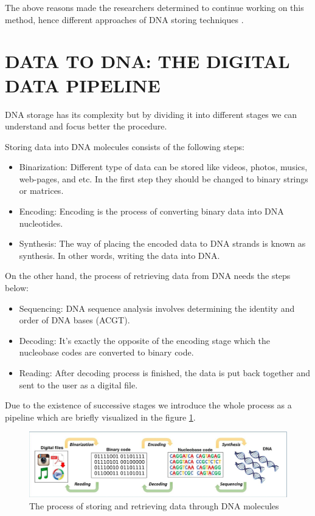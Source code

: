 \documentclass[10pt,twocolumn,twoside]{gsajnl}
\theoremstyle{definition}
\begin{document}
The above reasons made the researchers determined to continue working on this method, hence different approaches of DNA storing techniques \cite{grass2015robust}.

\section{DATA TO DNA: THE DIGITAL DATA PIPELINE }
\label{sec: DATA TO DNA: THE DIGITAL DATA PIPELINE}
DNA storage has its complexity but by dividing it into different stages we can understand and focus better the procedure.

Storing data into DNA molecules consists of the following steps:
\begin{itemize}
    \item Binarization: Different type of data can be stored like videos, photos, musics, web-pages, and etc. In the first step they should be changed to binary strings or matrices.
    \item Encoding: Encoding is the process of converting binary data into DNA nucleotides.
    \item Synthesis: The way of placing the encoded data to DNA strands is known as synthesis. In other words, writing the data into DNA.
\end{itemize}

On the other hand, the process of retrieving data from DNA needs the steps below:
\begin{itemize}
    \item Sequencing: DNA sequence analysis involves determining the identity and order of DNA bases (ACGT).
    \item Decoding: It's exactly the opposite of the encoding stage which the nucleobase codes are converted to binary code.
    \item Reading: After decoding process is finished, the data is put back together and sent to the user as a digital file.
\end{itemize}

Due to the existence of successive stages we introduce the whole process as a pipeline which are briefly visualized in the figure \ref{fig3}. 
\begin{figure}[ht]
    \centering
    \includegraphics[width=\textwidth]{Figures/pipeline.png}
    \caption{The process of storing and retrieving data through DNA molecules \cite{Swati2017ARO}}
    \label{fig3}
\end{figure}
\end{document}
